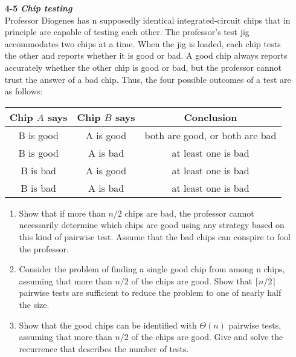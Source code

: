 \documentclass[fontsize=12pt,paper=a4]{book}
\begin{document}
\begin{enumerate}
 \item[\textbf{4-5}]
       \textbf{\textit{Chip testing}}\\
       Professor Diogenes has n supposedly identical integrated-circuit chips that in principle are capable of testing each other. The professor's test jig accommodates two
       chips at a time. When the jig is loaded, each chip tests the other and reports whether
       it is good or bad. A good chip always reports accurately whether the other chip is
       good or bad, but the professor cannot trust the answer of a bad chip. Thus, the four
       possible outcomes of a test are as follows: \\
       \begin{tabular}{c c c}
        Chip $A$ says & Chip $B$ says & Conclusion                     \\
        \hline
        B is good     & A is good     & both are good, or both are bad \\
        B is good     & A is bad      & at least one is bad            \\
        B is bad      & A is good     & at least one is bad            \\
        B is bad      & A is bad      & at least one is bad            
       \end{tabular}
       \begin{enumerate}
        \item Show that if more than $n/2$ chips are bad, the professor cannot necessarily determine which chips are good using any strategy based on this kind of pairwise test. Assume that the bad chips can conspire to fool the professor.
        \item Consider the problem of finding a single good chip from among n chips, assuming that more than $n/2$ of the chips are good. Show that $\lceil n/2 \rceil$ pairwise tests are sufficient to reduce the problem to one of nearly half the size.
        \item Show that the good chips can be identified with $\Theta(n)$ pairwise tests, assuming that more than $n/2$ of the chips are good. Give and solve the recurrence that describes the number of tests.
       \end{enumerate}
       

\end{enumerate}
\end{document}
